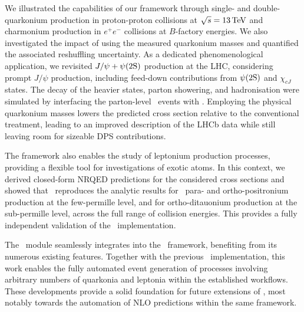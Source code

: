 We illustrated the capabilities of our framework through single- and double-quarkonium production in proton-proton collisions at $\sqrt{s} = 13\,{\rm TeV}$ and charmonium production in $e^+ e^-$ collisions at $B$-factory energies. We also investigated the impact of using the measured quarkonium masses and quantified the associated reshuffling uncertainty. As a dedicated phenomenological application, we revisited $J/\psi + \psi(2\mathrm{S})$ production at the LHC, considering prompt $J/\psi$ production, including feed-down contributions from $\psi(2\mathrm{S})$ and $\chi_{cJ}$ states. The decay of the heavier states, parton showering, and hadronisation were simulated by interfacing the parton-level \mgshort\ events with . Employing the physical quarkonium masses lowers the predicted cross section relative to the conventional treatment, leading to an improved description of the LHCb data while still leaving room for sizeable DPS contributions.

The framework also enables the study of leptonium production processes, providing a flexible tool for investigations of exotic atoms. In this context, we derived closed-form NRQED predictions for the considered cross sections and showed that \mgshort\ reproduces the analytic results for \pwavetxt\ para- and ortho-positronium production at the few-permille level, and for ortho-ditauonium production at the sub-permille level, across the full range of collision energies. This provides a fully independent validation of the \pwavetxt\ implementation. 

The \madsons\ module seamlessly integrates into the \mgshort\ framework, benefiting from its numerous existing features. Together with the previous \swavetxt\ implementation, this work enables the fully automated event generation of processes involving arbitrary numbers of quarkonia and leptonia within the established workflows. These developments provide a solid foundation for future extensions of \madsons, most notably towards the automation of NLO predictions within the same framework.